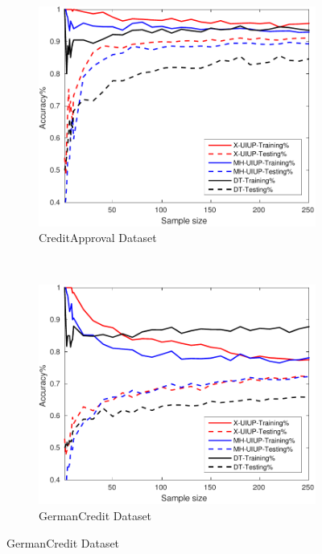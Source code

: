 \begin{figure}[ht]
\begin{subfigure}[b]{0.3\textwidth}
	\end{subfigure}
  \begin{subfigure}[b]{0.3\textwidth}
		\centering
  	\includegraphics[width=\textwidth]{figs/PLPTF/Trees/CreditApprovalDownsampledFurther_Trees_X_MH.pdf}
  	\caption{CreditApproval Dataset}
		\label{fig:Crd1}
	\end{subfigure}
  \\
  \begin{subfigure}[b]{0.3\textwidth}
		\centering
  	\includegraphics[width=\textwidth]{figs/PLPTF/Trees/GermanCreditDownsampledFurther_Trees_X_MH.pdf}
  	\caption{GermanCredit Dataset}

\end{subfigure}
\end{figure}

